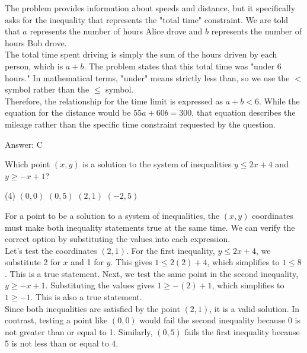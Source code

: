 \documentclass[11pt,paper=a4,answers]{exam}
\begin{document}
\begin{questions}
\begin{solution}
The problem provides information about speeds and distance, but it specifically asks for the inequality that represents the "total time" constraint. We are told that $a$ represents the number of hours Alice drove and $b$ represents the number of hours Bob drove.
\\[10pt]
The total time spent driving is simply the sum of the hours driven by each person, which is $a + b$. The problem states that this total time was "under 6 hours." In mathematical terms, "under" means strictly less than, so we use the $<$ symbol rather than the $\leq$ symbol.
\\[10pt]
Therefore, the relationship for the time limit is expressed as $a + b < 6$. While the equation for the distance would be $55a + 60b = 300$, that equation describes the mileage rather than the specific time constraint requested by the question.

\vspace{15pt}
Answer: \colorbox{yellow!100}{C}
\end{solution}

\question
Which point $(x, y)$ is a solution to the system of inequalities $y \leq 2x + 4$ and $y \geq -x + 1$?
\begin{tasks}(4)
    \task $(0, 0)$
    \task $(0, 5)$
    \task $(2, 1)$
    \task $(-2, 5)$
\end{tasks}

\begin{solution}
For a point to be a solution to a system of inequalities, the $(x, y)$ coordinates must make both inequality statements true at the same time. We can verify the correct option by substituting the values into each expression.
\\[10pt]
Let's test the coordinates $(2, 1)$. For the first inequality, $y \leq 2x + 4$, we substitute 2 for $x$ and 1 for $y$. This gives $1 \leq 2(2) + 4$, which simplifies to $1 \leq 8$. This is a true statement. Next, we test the same point in the second inequality, $y \geq -x + 1$. Substituting the values gives $1 \geq -(2) + 1$, which simplifies to $1 \geq -1$. This is also a true statement.
\\[10pt]
Since both inequalities are satisfied by the point $(2, 1)$, it is a valid solution. In contrast, testing a point like $(0, 0)$ would fail the second inequality because 0 is not greater than or equal to 1. Similarly, $(0, 5)$ fails the first inequality because 5 is not less than or equal to 4.


\end{solution}
\end{questions}
\end{document}
